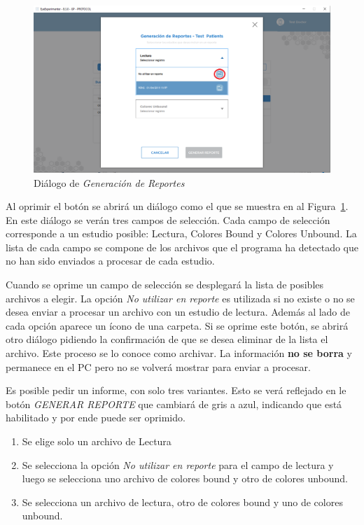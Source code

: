 \documentclass[a4paper,10pt]{article}
\begin{document}
\begin{figure}[!h]
\centering
\includegraphics[scale = 0.4]{selectt_first.png}
\caption{Diálogo de \textit{Generación de Reportes}}
\label{fig_rep_gen}
\end{figure}

Al oprimir el botón se abrirá un diálogo como el que se muestra en al Figura~\ref{fig_rep_gen}. En este diálogo se verán tres campos de selección. Cada campo de selección corresponde a un estudio posible: Lectura, Colores Bound y Colores Unbound. La lista de cada campo se compone de los archivos que el programa ha detectado que no han sido enviados a procesar de cada estudio. 

Cuando se oprime un campo de selección se desplegará la lista de posibles archivos a elegir. La opción \textit{No utilizar en reporte} es utilizada si no existe o no se desea enviar a procesar un archivo con un estudio de lectura. Además al lado de cada opción aparece un ícono de una carpeta. Si se oprime este botón, se abrirá otro diálogo pidiendo la confirmación de que se desea eliminar de la lista el archivo. Este proceso se lo conoce como archivar. La información \textbf{no se borra} y permanece en el PC pero no se volverá mostrar para enviar a procesar.

Es posible pedir un informe, con solo tres variantes. Esto se verá reflejado en le botón \textit{GENERAR REPORTE} que cambiará de gris a azul, indicando que está habilitado y por ende puede ser oprimido.
\begin{enumerate}
 \item Se elige solo un archivo de Lectura
 \item Se selecciona la opción \textit{No utilizar en reporte} para el campo de lectura y luego se selecciona uno archivo de colores bound y otro de colores unbound.
 \item Se selecciona un archivo de lectura, otro de colores bound y uno de colores unbound.
\end{enumerate}
\end{document}
